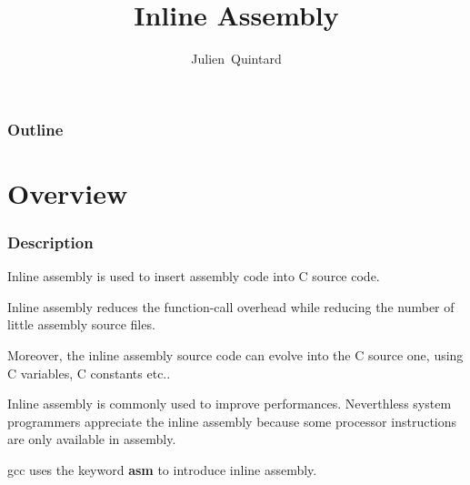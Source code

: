 
%
%



%
%

\title{Inline Assembly}

%
%

\author
{
  Julien~Quintard
}

%
%



%
%

\begin{frame}
  \titlepage

  \begin{center}
    \logos
  \end{center}
\end{frame}

%
%

\begin{frame}
  \frametitle{Outline}
  \tableofcontents
\end{frame}

%
%

\section{Overview}


\begin{frame}
  \frametitle{Description}

  Inline assembly is used to insert assembly code into C source code.

  \nl

  Inline assembly reduces the function-call overhead while reducing
  the number of little assembly source files.

  \nl

  Moreover, the inline assembly source code can evolve into the C
  source one, using C variables, C constants etc..

  \nl

  Inline assembly is commonly used to improve performances. Neverthless
  system programmers appreciate the inline assembly because some
  processor instructions are only available in assembly.

  \nl

  gcc uses the keyword \textbf{asm} to introduce inline assembly.
\end{frame}

